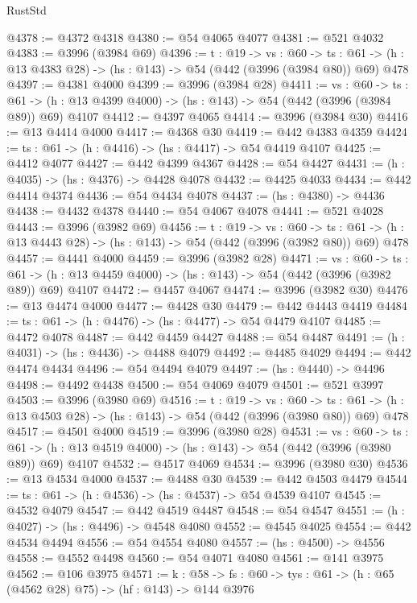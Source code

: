 \begin{lexlean}{RustStd}
\begin{coremodule}
@4378 := @4372 @4318
@4380 := @54 @4065 @4077
@4381 := @521 @4032
@4383 := @3996 (@3984 @69)
@4396 := {t : @19} ->
  {vs : @60} ->
  {ts : @61} -> (h : @13 @4383 @28) -> (hs : @143) -> @54 (@442 (@3996 (@3984 @80)) @69) @478
@4397 := @4381 @4000
@4399 := @3996 (@3984 @28)
@4411 := {vs : @60} ->
  {ts : @61} -> (h : @13 @4399 @4000) -> (hs : @143) -> @54 (@442 (@3996 (@3984 @89)) @69) @4107
@4412 := @4397 @4065
@4414 := @3996 (@3984 @30)
@4416 := @13 @4414 @4000
@4417 := @4368 @30
@4419 := @442 @4383 @4359
@4424 := {ts : @61} -> (h : @4416) -> (hs : @4417) -> @54 @4419 @4107
@4425 := @4412 @4077
@4427 := @442 @4399 @4367
@4428 := @54 @4427
@4431 := (h : @4035) -> (hs : @4376) -> @4428 @4078
@4432 := @4425 @4033
@4434 := @442 @4414 @4374
@4436 := @54 @4434 @4078
@4437 := (hs : @4380) -> @4436
@4438 := @4432 @4378
@4440 := @54 @4067 @4078
@4441 := @521 @4028
@4443 := @3996 (@3982 @69)
@4456 := {t : @19} ->
  {vs : @60} ->
  {ts : @61} -> (h : @13 @4443 @28) -> (hs : @143) -> @54 (@442 (@3996 (@3982 @80)) @69) @478
@4457 := @4441 @4000
@4459 := @3996 (@3982 @28)
@4471 := {vs : @60} ->
  {ts : @61} -> (h : @13 @4459 @4000) -> (hs : @143) -> @54 (@442 (@3996 (@3982 @89)) @69) @4107
@4472 := @4457 @4067
@4474 := @3996 (@3982 @30)
@4476 := @13 @4474 @4000
@4477 := @4428 @30
@4479 := @442 @4443 @4419
@4484 := {ts : @61} -> (h : @4476) -> (hs : @4477) -> @54 @4479 @4107
@4485 := @4472 @4078
@4487 := @442 @4459 @4427
@4488 := @54 @4487
@4491 := (h : @4031) -> (hs : @4436) -> @4488 @4079
@4492 := @4485 @4029
@4494 := @442 @4474 @4434
@4496 := @54 @4494 @4079
@4497 := (hs : @4440) -> @4496
@4498 := @4492 @4438
@4500 := @54 @4069 @4079
@4501 := @521 @3997
@4503 := @3996 (@3980 @69)
@4516 := {t : @19} ->
  {vs : @60} ->
  {ts : @61} -> (h : @13 @4503 @28) -> (hs : @143) -> @54 (@442 (@3996 (@3980 @80)) @69) @478
@4517 := @4501 @4000
@4519 := @3996 (@3980 @28)
@4531 := {vs : @60} ->
  {ts : @61} -> (h : @13 @4519 @4000) -> (hs : @143) -> @54 (@442 (@3996 (@3980 @89)) @69) @4107
@4532 := @4517 @4069
@4534 := @3996 (@3980 @30)
@4536 := @13 @4534 @4000
@4537 := @4488 @30
@4539 := @442 @4503 @4479
@4544 := {ts : @61} -> (h : @4536) -> (hs : @4537) -> @54 @4539 @4107
@4545 := @4532 @4079
@4547 := @442 @4519 @4487
@4548 := @54 @4547
@4551 := (h : @4027) -> (hs : @4496) -> @4548 @4080
@4552 := @4545 @4025
@4554 := @442 @4534 @4494
@4556 := @54 @4554 @4080
@4557 := (hs : @4500) -> @4556
@4558 := @4552 @4498
@4560 := @54 @4071 @4080
@4561 := @141 @3975
@4562 := @106 @3975
@4571 := {k : @58} ->
  {fs : @60} -> {tys : @61} -> (h : @65 (@4562 @28) @75) -> (hf : @143) -> @144 @3976

\end{coremodule}
\end{lexlean}

